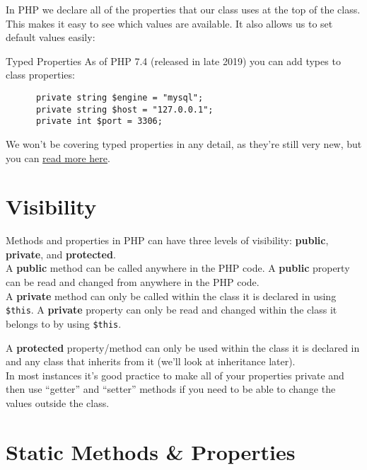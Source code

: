 In PHP we declare all of the properties that our class uses at the top of the class. This makes it easy to see which values are available. It also allows us to set default values easily:


\begin{infobox}{Typed Properties}
    As of PHP 7.4 (released in late 2019) you can add types to class properties:

    \begin{verbatim}
      private string $engine = "mysql";
      private string $host = "127.0.0.1";
      private int $port = 3306;
    \end{verbatim}

    We won't be covering typed properties in any detail, as they're still very new, but you can \href{https://stitcher.io/blog/typed-properties-in-php-74}{read more here}.
\end{infobox}



\section{Visibility}

Methods and properties in PHP can have three levels of visibility: \textbf{public}, \textbf{private}, and \textbf{protected}.
\\

A \textbf{public} method can be called anywhere in the PHP code. A \textbf{public} property can be read and changed from anywhere in the PHP code.
\\

A \textbf{private} method can only be called within the class it is declared in using \texttt{\$this}. A \textbf{private} property can only be read and changed within the class it belongs to by using \texttt{\$this}.


A \textbf{protected} property/method can only be used within the class it is declared in and any class that inherits from it (we'll look at inheritance later).
\\

In most instances it's good practice to make all of your properties private and then use ``getter'' and ``setter'' methods if you need to be able to change the values outside the class.


\section{Static Methods \& Properties}

